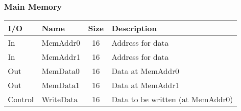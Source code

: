 \documentclass{article}
\begin{document}
		\subsubsection{Main Memory}
			\begin{center} \begin{tabular}{| l | l | c | l |} \hline 
				I/O & Name      & Size & Description \\ \hline 
				In  & MemAddr0  & 16   & Address for data\\ \hline
				In  & MemAddr1  & 16   & Address for data\\ \hline
				Out & MemData0  & 16   & Data at MemAddr0 \\ \hline
				Out & MemData1  & 16   & Data at MemAddr1 \\ \hline
				Control & WriteData & 16   & Data to be written (at MemAddr0) \\ \hline
			\end{tabular} \end{center}
\end{document}
